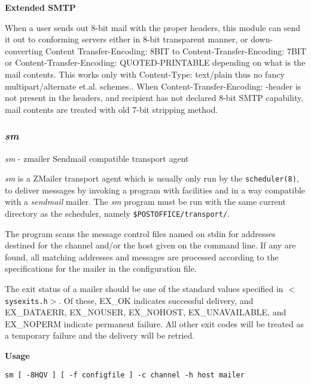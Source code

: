 {\bf Extended SMTP}

When a user sends out 8-bit mail with the proper headers, this
module can send it out to conforming servers either in
8-bit transparent manner, or down-converting Content 
Transfer-Encoding: 8BIT to Content-Transfer-Encoding: 7BIT
or Content-Transfer-Encoding: QUOTED-PRINTABLE depending
on what is the mail contents.
This works only with Content-Type: text/plain thus no
fancy multipart/alternate et.al. schemes..
When Content-Transfer-Encoding: -header is not present in
the headers, and recipient has not declared 8-bit SMTP
capability, mail contents are treated with old 7-bit
stripping method.








\subsubsection{{\em sm\/}}



{\em sm\/} - zmailer Sendmail compatible transport agent

{\em sm\/} is a ZMailer transport agent which is usually only run
by the {\tt scheduler(8)}, to deliver messages by invoking a
program with facilities and in a way compatible with a
{\em sendmail\/} mailer. The {\em sm\/} program must be run with the same
current directory as the scheduler, namely 
{\tt \$POSTOFFICE/transport/}.

The program scans the message control files named on stdin
for addresses destined for the channel and/or the host
given on the command line. If any are found, all matching
addresses and messages are processed according to the
specifications for the mailer in the configuration file.

The exit status of a mailer should be one of the standard
values specified in {\tt {\(<\)}sysexits.h{\(>\)}}. Of these, EX\_OK indicates 
successful delivery, and EX\_DATAERR, EX\_NOUSER,
EX\_NOHOST, EX\_UNAVAILABLE, and EX\_NOPERM indicate permanent 
failure. All other exit codes will be treated as a
temporary failure and the delivery will be retried.

{\bf Usage}

\begin{tscreen}
\begin{verbatim}
sm [ -8HQV ] [ -f configfile ] -c channel -h host mailer
\end{verbatim}
\end{tscreen}


